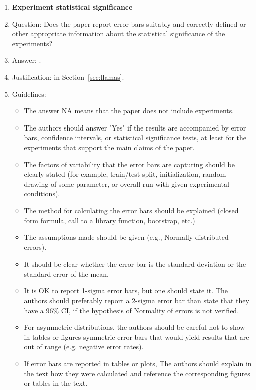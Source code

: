 \documentclass{article}
\begin{document}
{\begin{enumerate}
\item {\bf Experiment statistical significance}
    \item[] Question: Does the paper report error bars suitably and correctly defined or other appropriate information about the statistical significance of the experiments?
    \item[] Answer: \answerYes{}.
    \item[] Justification: in Section~\ref{sec:llamas}.
    \item[] Guidelines:
    \begin{itemize}
        \item The answer NA means that the paper does not include experiments.
        \item The authors should answer "Yes" if the results are accompanied by error bars, confidence intervals, or statistical significance tests, at least for the experiments that support the main claims of the paper.
        \item The factors of variability that the error bars are capturing should be clearly stated (for example, train/test split, initialization, random drawing of some parameter, or overall run with given experimental conditions).
        \item The method for calculating the error bars should be explained (closed form formula, call to a library function, bootstrap, etc.)
        \item The assumptions made should be given (e.g., Normally distributed errors).
        \item It should be clear whether the error bar is the standard deviation or the standard error of the mean.
        \item It is OK to report 1-sigma error bars, but one should state it. The authors should preferably report a 2-sigma error bar than state that they have a 96\% CI, if the hypothesis of Normality of errors is not verified.
        \item For asymmetric distributions, the authors should be careful not to show in tables or figures symmetric error bars that would yield results that are out of range (e.g. negative error rates).
        \item If error bars are reported in tables or plots, The authors should explain in the text how they were calculated and reference the corresponding figures or tables in the text.
    \end{itemize}


\end{enumerate}}
\end{document}
